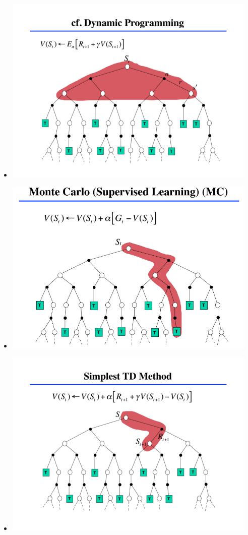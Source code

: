 \documentclass{beamer} %
\begin{document}
\begin{frame}
\begin{columns}
\begin{column}{.5\textwidth}
\begin{block}{}
\begin{itemize}
\begin{itemize}
					\end{itemize}
			\end{itemize}
    	\end{block}
    \end{column}
    \begin{column}{.5\textwidth}
    \begin{block}{}
		\begin{itemize}
			\item \includegraphics[height=.25\textheight, width=.5\textwidth]{dp.png}
			\item \includegraphics[height=.25\textheight, width=.5\textwidth]{mc.png}
			\item \includegraphics[height=.3\textheight, width=.5\textwidth]{td.png}

		\end{itemize}
    \end{block}
    \end{column}
\end{columns}

\end{frame}
\end{document}
